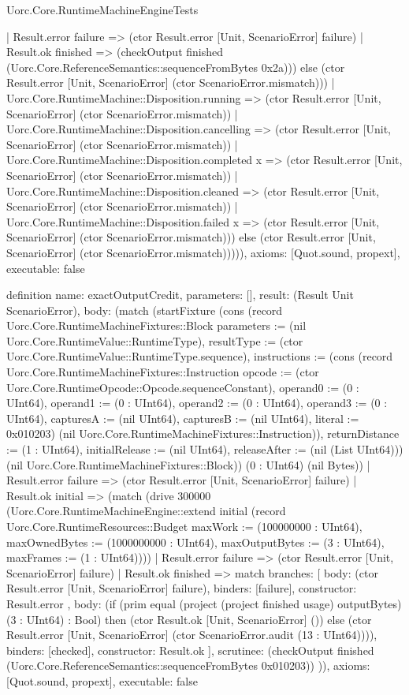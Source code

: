 \begin{lexlean}{Uorc.Core.RuntimeMachineEngineTests}
\begin{semanticmodule}
{          | Result.error failure => (ctor Result.error [Unit, ScenarioError] failure)
          | Result.ok finished => (checkOutput finished (Uorc.Core.ReferenceSemantics::sequenceFromBytes 0x2a))) else (ctor Result.error [Unit, ScenarioError] (ctor ScenarioError.mismatch)))
        | Uorc.Core.RuntimeMachine::Disposition.running => (ctor Result.error [Unit, ScenarioError] (ctor ScenarioError.mismatch))
        | Uorc.Core.RuntimeMachine::Disposition.cancelling => (ctor Result.error [Unit, ScenarioError] (ctor ScenarioError.mismatch))
        | Uorc.Core.RuntimeMachine::Disposition.completed x => (ctor Result.error [Unit, ScenarioError] (ctor ScenarioError.mismatch))
        | Uorc.Core.RuntimeMachine::Disposition.cleaned => (ctor Result.error [Unit, ScenarioError] (ctor ScenarioError.mismatch))
        | Uorc.Core.RuntimeMachine::Disposition.failed x => (ctor Result.error [Unit, ScenarioError] (ctor ScenarioError.mismatch))) else (ctor Result.error [Unit, ScenarioError] (ctor ScenarioError.mismatch))))),
  axioms: [Quot.sound, propext],
  executable: false
}

definition{
  name: exactOutputCredit,
  parameters: [],
  result: (Result Unit ScenarioError),
  body: (match (startFixture (cons (record Uorc.Core.RuntimeMachineFixtures::Block {parameters := (nil Uorc.Core.RuntimeValue::RuntimeType), resultType := (ctor Uorc.Core.RuntimeValue::RuntimeType.sequence), instructions := (cons (record Uorc.Core.RuntimeMachineFixtures::Instruction {opcode := (ctor Uorc.Core.RuntimeOpcode::Opcode.sequenceConstant), operand0 := (0 : UInt64), operand1 := (0 : UInt64), operand2 := (0 : UInt64), operand3 := (0 : UInt64), capturesA := (nil UInt64), capturesB := (nil UInt64), literal := 0x010203}) (nil Uorc.Core.RuntimeMachineFixtures::Instruction)), returnDistance := (1 : UInt64), initialRelease := (nil UInt64), releaseAfter := (nil (List UInt64))}) (nil Uorc.Core.RuntimeMachineFixtures::Block)) (0 : UInt64) (nil Bytes))
    | Result.error failure => (ctor Result.error [Unit, ScenarioError] failure)
    | Result.ok initial => (match (drive 300000 (Uorc.Core.RuntimeMachineEngine::extend initial (record Uorc.Core.RuntimeResources::Budget {maxWork := (100000000 : UInt64), maxOwnedBytes := (1000000000 : UInt64), maxOutputBytes := (3 : UInt64), maxFrames := (1 : UInt64)})))
      | Result.error failure => (ctor Result.error [Unit, ScenarioError] failure)
      | Result.ok finished => match{
        branches: [
          {
            body: (ctor Result.error [Unit, ScenarioError] failure),
            binders: [failure],
            constructor: Result.error
          },
          {
            body: (if (prim equal (project (project finished usage) outputBytes) (3 : UInt64) : Bool) then (ctor Result.ok [Unit, ScenarioError] ()) else (ctor Result.error [Unit, ScenarioError] (ctor ScenarioError.audit (13 : UInt64)))),
            binders: [checked],
            constructor: Result.ok
          }
        ],
        scrutinee: (checkOutput finished (Uorc.Core.ReferenceSemantics::sequenceFromBytes 0x010203))
      })),
  axioms: [Quot.sound, propext],
  executable: false
}


\end{semanticmodule}
\end{lexlean}
